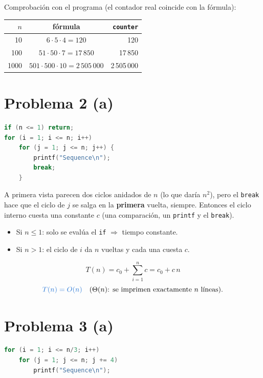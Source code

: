\documentclass[11pt]{article}
\newcommand{\res}[1]{\textcolor{azul}{\textbf{#1}}}
\begin{document}
\noindent Comprobación con el programa (el contador real coincide con la fórmula):
\begin{center}
\begin{tabular}{rcr}
  \toprule
  $n$ & fórmula & \texttt{counter} \\
  \midrule
  10   & $6 \cdot 5 \cdot 4 = 120$                 & 120 \\
  100  & $51 \cdot 50 \cdot 7 = 17\,850$           & 17\,850 \\
  1000 & $501 \cdot 500 \cdot 10 = 2\,505\,000$    & 2\,505\,000 \\
  \bottomrule
\end{tabular}
\end{center}

\section*{Problema 2 (a)}

\begin{lstlisting}[language=C]
if (n <= 1) return;
for (i = 1; i <= n; i++)
    for (j = 1; j <= n; j++) {
        printf("Sequence\n");
        break;
    }
\end{lstlisting}

A primera vista parecen dos ciclos anidados de $n$ (lo que daría $n^2$), pero el
\texttt{break} hace que el ciclo de $j$ se salga en la \textbf{primera} vuelta, siempre.
Entonces el ciclo interno cuesta una constante $c$ (una comparación, un \texttt{printf} y el
\texttt{break}).

\begin{itemize}
  \item Si $n \le 1$: solo se evalúa el \texttt{if} $\Rightarrow$ tiempo constante.
  \item Si $n > 1$: el ciclo de $i$ da $n$ vueltas y cada una cuesta $c$.
\end{itemize}
\[
  T(n) = c_0 + \sum_{i=1}^{n} c = c_0 + c\,n
\]
\[
  \res{$T(n) = O(n)$} \quad \text{($\Theta(n)$: se imprimen exactamente $n$ líneas).}
\]

\section*{Problema 3 (a)}

\begin{lstlisting}[language=C]
for (i = 1; i <= n/3; i++)
    for (j = 1; j <= n; j += 4)
        printf("Sequence\n");
\end{lstlisting}
\end{document}
